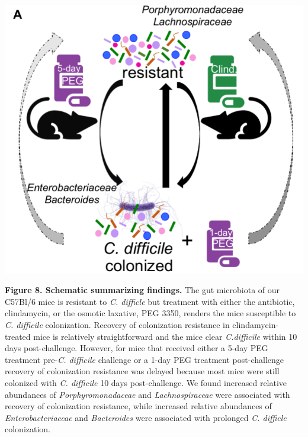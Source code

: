 \documentclass[
  11pt,
]{article}
\begin{document}
\includegraphics{figure_8.pdf}

\textbf{Figure 8. Schematic summarizing findings.} The gut microbiota of
our C57Bl/6 mice is resistant to \emph{C. difficle} but treatment with
either the antibiotic, clindamycin, or the osmotic laxative, PEG 3350,
renders the mice susceptible to \emph{C. difficile} colonization.
Recovery of colonization resistance in clindamycin-treated mice is
relatively straightforward and the mice clear \emph{C.difficile} within
10 days post-challenge. However, for mice that received either a 5-day
PEG treatment pre-\emph{C. difficile} challenge or a 1-day PEG treatment
post-challenge recovery of colonization resistance was delayed because
most mice were still colonized with \emph{C. difficile} 10 days
post-challenge. We found increased relative abundances of
\emph{Porphyromonadaceae} and \emph{Lachnospiraceae} were associated
with recovery of colonization resistance, while increased relative
abundances of \emph{Enterobacteriaceae} and \emph{Bacteroides} were
associated with prolonged \emph{C. difficle} colonization. \newpage
\end{document}
